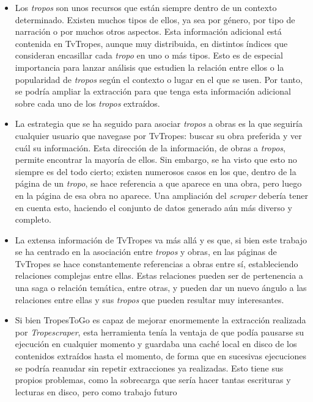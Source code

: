 \begin{itemize}
    \item Los \textit{tropos} son unos recursos que están siempre dentro de un
    contexto determinado. Existen muchos tipos de ellos, ya sea por género, por
    tipo de narración o por muchos otros aspectos. Esta información adicional
    está contenida en TvTropes, aunque muy distribuida, en distintos índices que
    consideran encasillar cada \textit{tropo} en uno o más tipos. Esto es de
    especial importancia para lanzar análisis que estudien la relación entre
    ellos o la popularidad de \textit{tropos} según el contexto o lugar en el
    que se usen. Por tanto, se podría ampliar la extracción para que tenga esta
    información adicional sobre cada uno de los \textit{tropos} extraídos.
    \item La estrategia que se ha seguido para asociar \textit{tropos} a obras
    es la que seguiría cualquier usuario que navegase por TvTropes: buscar su
    obra preferida y ver cuál su información. Esta dirección de la información,
    de obras a \textit{tropos}, permite encontrar la mayoría de ellos. Sin
    embargo, se ha visto que esto no siempre es del todo cierto; existen
    numerosos casos en los que, dentro de la página de un \textit{tropo}, se
    hace referencia a que aparece en una obra, pero luego en la página de esa
    obra no aparece. Una ampliación del \textit{scraper} debería tener en cuenta
    esto, haciendo el conjunto de datos generado aún más diverso y completo.
    \item La extensa información de TvTropes va más allá y es que, si bien este
    trabajo se ha centrado en la asociación entre \textit{tropos} y obras, en
    las páginas de TvTropes se hace constantemente referencias a obras entre sí,
    estableciendo relaciones complejas entre ellas. Estas relaciones pueden ser
    de pertenencia a una saga o relación temática, entre otras, y pueden dar un
    nuevo ángulo a las relaciones entre ellas y sus \textit{tropos} que pueden
    resultar muy interesantes.
    \item Si bien TropesToGo es capaz de mejorar enormemente la extracción
    realizada por \textit{Tropescraper}, esta herramienta tenía la ventaja de
    que podía pausarse su ejecución en cualquier momento y guardaba una caché
    local en disco de los contenidos extraídos hasta el momento, de forma que en
    sucesivas ejecuciones se podría reanudar sin repetir extracciones ya
    realizadas. Esto tiene sus propios problemas, como la sobrecarga que sería
    hacer tantas escrituras y lecturas en disco, pero como trabajo futuro

\end{itemize}
